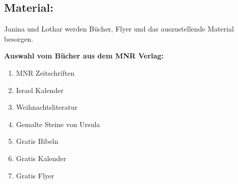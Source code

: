 \documentclass{mybib}
\begin{document}
\subsection{Material:}
Janina und Lothar werden Bücher, Flyer und das auszustellende Material besorgen.

\textbf{Auswahl vom Bücher aus dem MNR Verlag:}
\begin{enumerate}  
  \item MNR Zeitschriften
  \item Israel Kalender
  \item Weihnachtsliteratur
  \item Gemalte Steine von Ursula
  \item Gratis Bibeln
  \item Gratis Kalender
  \item Gratis Flyer
\end{enumerate}

    
\end{document}
